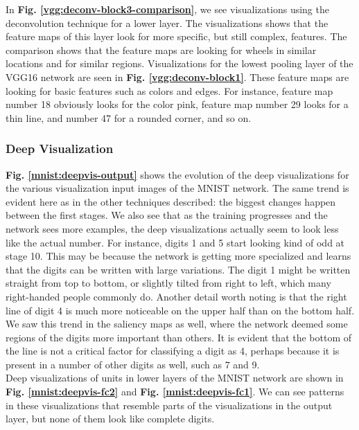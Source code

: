 \noindent In \textbf{Fig. \ref{vgg:deconv-block3-comparison}}, we see visualizations using the deconvolution technique for a lower layer. The visualizations shows that the feature maps of this layer look for more specific, but still complex, features. The comparison shows that the feature maps are looking for wheels in similar locations and for similar regions. Visualizations for the lowest pooling layer of the VGG16 network are seen in \textbf{Fig. \ref{vgg:deconv-block1}}. These feature maps are looking for basic features such as colors and edges. For instance, feature map number 18 obviously looks for the color pink, feature map number 29 looks for a thin line, and number 47 for a rounded corner, and so on. 

\subsubsection{Deep Visualization}

\textbf{Fig. \ref{mnist:deepvis-output}} shows the evolution of the deep visualizations for the various visualization input images of the MNIST network. The same trend is evident here as in the other techniques described: the biggest changes happen between the first stages. We also see that as the training progresses and the network sees more examples, the deep visualizations actually seem to look less like the actual number. For instance, digits 1 and 5 start looking kind of odd at stage 10. This may be because the network is getting more specialized and learns that the digits can be written with large variations. The digit 1 might be written straight from top to bottom, or slightly tilted from right to left, which many right-handed people commonly do. Another detail worth noting is that the right line of digit 4 is much more noticeable on the upper half than on the bottom half. We saw this trend in the saliency maps as well, where the network deemed some regions of the digits more important than others. It is evident that the bottom of the line is not a critical factor for classifying a digit as 4, perhaps because it is present in a number of other digits as well, such as 7 and 9.\\

\noindent Deep visualizations of units in lower layers of the MNIST network are shown in \textbf{Fig. \ref{mnist:deepvis-fc2}} and \textbf{Fig. \ref{mnist:deepvis-fc1}}. We can see patterns in these visualizations that resemble parts of the visualizations in the output layer, but none of them look like complete digits. \\

